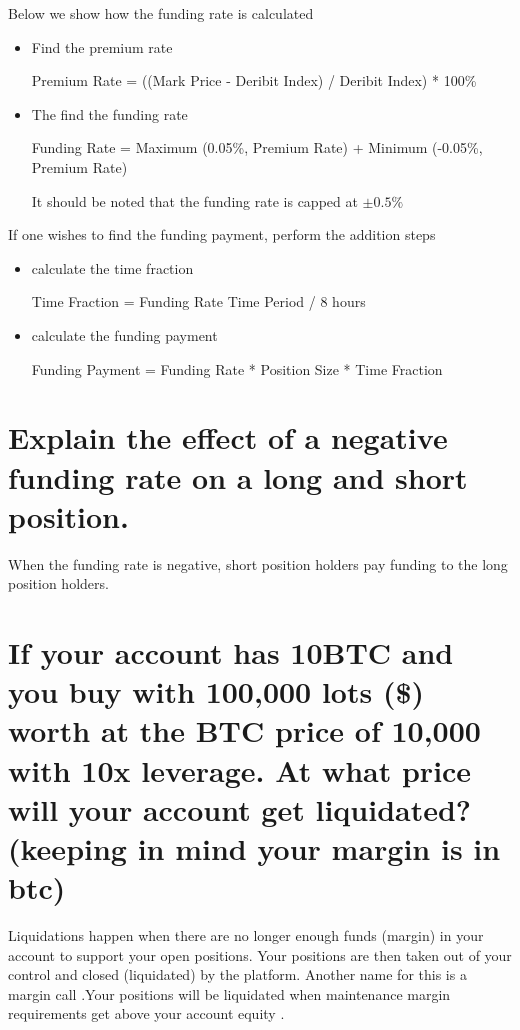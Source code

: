 Below we show how the funding rate is calculated \cite{perp}

\begin{itemize}

\item Find the premium rate

Premium Rate = ((Mark Price - Deribit Index) / Deribit Index) * 100\%

\item The find the funding rate 

Funding Rate = Maximum (0.05\%, Premium Rate) + Minimum (-0.05\%, Premium Rate)

It should be noted that the funding rate is capped at $\pm 0.5\%$
\end{itemize}

If one wishes to find the funding payment, perform the addition steps

\begin{itemize}
\item calculate the time fraction

Time Fraction = Funding Rate Time Period / 8 hours

\item calculate the funding payment 

Funding Payment = Funding Rate * Position Size * Time Fraction
\end{itemize}
\section{ Explain the effect of a negative funding rate on a long and short position.}
When the funding rate is negative, short position holders pay funding to the long position holders.




\section{ If your account has 10BTC and you buy with 100,000 lots (\$) worth at the BTC price of 10,000 with 10x leverage. At what price will your account get liquidated? (keeping in mind your margin is in btc)}

Liquidations happen when there are no longer enough funds (margin) in your account to support your open positions. Your positions are then taken out of your control and closed (liquidated) by the platform. Another name for this is a margin call .Your positions will be liquidated when maintenance margin requirements get above your account equity \cite{liq}. 

